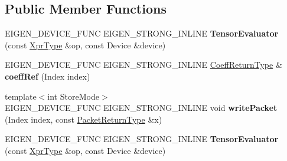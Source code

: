 \subsection*{Public Member Functions}
\begin{DoxyCompactItemize}
\item 
\mbox{\label{struct_eigen_1_1_tensor_evaluator_3_01_tensor_layout_swap_op_3_01_arg_type_01_4_00_01_device_01_4_aac2a4279b03440895789ebcb07b9d95a}} 
E\+I\+G\+E\+N\+\_\+\+D\+E\+V\+I\+C\+E\+\_\+\+F\+U\+NC E\+I\+G\+E\+N\+\_\+\+S\+T\+R\+O\+N\+G\+\_\+\+I\+N\+L\+I\+NE {\bfseries Tensor\+Evaluator} (const \hyperlink{class_eigen_1_1_tensor_layout_swap_op}{Xpr\+Type} \&op, const Device \&device)
\item 
\mbox{\label{struct_eigen_1_1_tensor_evaluator_3_01_tensor_layout_swap_op_3_01_arg_type_01_4_00_01_device_01_4_af6b35eff16e9d3337396d9a4935d9b39}} 
E\+I\+G\+E\+N\+\_\+\+D\+E\+V\+I\+C\+E\+\_\+\+F\+U\+NC E\+I\+G\+E\+N\+\_\+\+S\+T\+R\+O\+N\+G\+\_\+\+I\+N\+L\+I\+NE \hyperlink{group___sparse_core___module}{Coeff\+Return\+Type} \& {\bfseries coeff\+Ref} (Index index)
\item 
\mbox{\label{struct_eigen_1_1_tensor_evaluator_3_01_tensor_layout_swap_op_3_01_arg_type_01_4_00_01_device_01_4_a6470ad4d4223afec700ca7fcc7f62888}} 
{\footnotesize template$<$int Store\+Mode$>$ }\\E\+I\+G\+E\+N\+\_\+\+D\+E\+V\+I\+C\+E\+\_\+\+F\+U\+NC E\+I\+G\+E\+N\+\_\+\+S\+T\+R\+O\+N\+G\+\_\+\+I\+N\+L\+I\+NE void {\bfseries write\+Packet} (Index index, const \hyperlink{group___sparse_core___module}{Packet\+Return\+Type} \&x)
\item 
\mbox{\label{struct_eigen_1_1_tensor_evaluator_3_01_tensor_layout_swap_op_3_01_arg_type_01_4_00_01_device_01_4_aac2a4279b03440895789ebcb07b9d95a}} 
E\+I\+G\+E\+N\+\_\+\+D\+E\+V\+I\+C\+E\+\_\+\+F\+U\+NC E\+I\+G\+E\+N\+\_\+\+S\+T\+R\+O\+N\+G\+\_\+\+I\+N\+L\+I\+NE {\bfseries Tensor\+Evaluator} (const \hyperlink{class_eigen_1_1_tensor_layout_swap_op}{Xpr\+Type} \&op, const Device \&device)

\end{DoxyCompactItemize}

